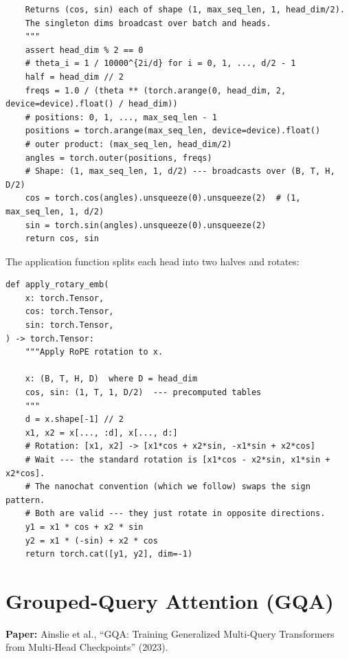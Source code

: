 \begin{lstlisting}
    Returns (cos, sin) each of shape (1, max_seq_len, 1, head_dim/2).
    The singleton dims broadcast over batch and heads.
    """
    assert head_dim % 2 == 0
    # theta_i = 1 / 10000^{2i/d} for i = 0, 1, ..., d/2 - 1
    half = head_dim // 2
    freqs = 1.0 / (theta ** (torch.arange(0, head_dim, 2, device=device).float() / head_dim))
    # positions: 0, 1, ..., max_seq_len - 1
    positions = torch.arange(max_seq_len, device=device).float()
    # outer product: (max_seq_len, head_dim/2)
    angles = torch.outer(positions, freqs)
    # Shape: (1, max_seq_len, 1, d/2) --- broadcasts over (B, T, H, D/2)
    cos = torch.cos(angles).unsqueeze(0).unsqueeze(2)  # (1, max_seq_len, 1, d/2)
    sin = torch.sin(angles).unsqueeze(0).unsqueeze(2)
    return cos, sin
\end{lstlisting}

The application function splits each head into two halves and rotates:

\begin{lstlisting}
def apply_rotary_emb(
    x: torch.Tensor,
    cos: torch.Tensor,
    sin: torch.Tensor,
) -> torch.Tensor:
    """Apply RoPE rotation to x.

    x: (B, T, H, D)  where D = head_dim
    cos, sin: (1, T, 1, D/2)  --- precomputed tables
    """
    d = x.shape[-1] // 2
    x1, x2 = x[..., :d], x[..., d:]
    # Rotation: [x1, x2] -> [x1*cos + x2*sin, -x1*sin + x2*cos]
    # Wait --- the standard rotation is [x1*cos - x2*sin, x1*sin + x2*cos].
    # The nanochat convention (which we follow) swaps the sign pattern.
    # Both are valid --- they just rotate in opposite directions.
    y1 = x1 * cos + x2 * sin
    y2 = x1 * (-sin) + x2 * cos
    return torch.cat([y1, y2], dim=-1)
\end{lstlisting}



\section{Grouped-Query Attention (GQA)}

\textbf{Paper:} Ainslie et al., ``GQA: Training Generalized Multi-Query Transformers from Multi-Head Checkpoints'' (2023).

